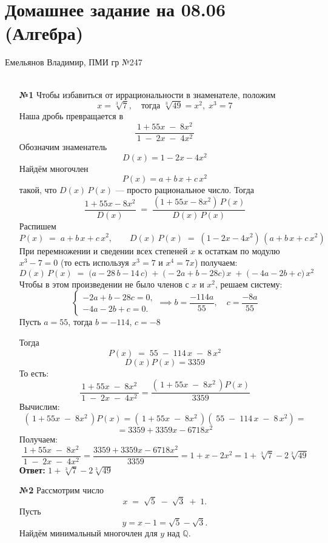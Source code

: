 \documentclass[a4paper]{article}
\renewcommand{\f}[2]{\frac{#1}{#2}}
\begin{document}
\section*{Домашнее задание на 08.06 (Алгебра)}
 {\large Емельянов Владимир, ПМИ гр №247}\\\\
\begin{enumerate}
  \item[\textbf{№1}]Чтобы избавиться от иррациональности в знаменателе, положим
  $$
  x = \sqrt[3]{7},\quad \text{тогда } \sqrt[3]{49} = x^2,\; x^3 = 7
  $$
  Наша дробь превращается в
  $$
  \frac{\,1 + 55x \;-\; 8x^2\,}{\,1 \;-\; 2x \;-\; 4x^2\,}
  $$
  Обозначим знаменатель
  $$
  D(x) = 1 - 2x - 4x^2
  $$
  Найдём многочлен
  $$
  P(x) = a + b\,x + c\,x^2
  $$
  такой, что $D(x)\,P(x)$ — просто рациональное число. Тогда
  $$
  \frac{1 + 55x - 8x^2}{D(x)} \;=\; \frac{(1 + 55x - 8x^2)\,P(x)}{D(x)\,P(x)}
  $$
  Распишем
  $$
  P(x) \;=\; a + b\,x + c\,x^2,
  \qquad 
  D(x)\,P(x) \;=\; (1 - 2x - 4x^2)\,(a + b\,x + c\,x^2)
  $$
  При перемножении и сведении всех степеней $x$ к остаткам по модулю $x^3 - 7 = 0$ (то есть используя $x^3 = 7$ и $x^4 = 7x$) получаем:
  $$
  D(x)\,P(x) \;=\; \bigl(a - 28\,b - 14\,c\bigr)
  \;+\;\bigl(-2a + b - 28c\bigr)\,x 
  \;+\;\bigl(-4a - 2b + c\bigr)\,x^2
  $$
  Чтобы в этом произведении не было членов с $x$ и $x^2$, решаем систему:
  $$
  \begin{cases}
  -2a + b - 28c = 0,\\
  -4a - 2b + c = 0.
  \end{cases} \implies b = \frac{-114a}{55}, \quad c = \frac{-8a}{55} 
  $$
  Пусть $a = 55$, тогда $b = -114$, $c = -8$
      
  Тогда
  $$
  P(x) \;=\; 55 \;-\; 114\,x \;-\; 8\,x^2
  $$
  $$
  D(x)P(x) = 3359
  $$
  То есть:
  $$
  \frac{\,1 + 55x \;-\; 8x^2\,}{\,1 \;-\; 2x \;-\; 4x^2\,} =
  \frac{(\,1 + 55x \;-\; 8x^2\,)P(x)}{3359}
  $$
  Вычислим:
  $$(\,1 + 55x \;-\; 8x^2\,)P(x) = (\,1 + 55x \;-\; 8x^2\,)(\; 55 \;-\; 114\,x \;-\; 8\,x^2) = $$
  $$=3359 + 3359x - 6718x^2$$
  Получаем:
  $$\frac{\,1 + 55x \;-\; 8x^2\,}{\,1 \;-\; 2x \;-\; 4x^2\,} = 
  \f{3359 + 3359x - 6718x^2}{3359} = 1 + x - 2x^2 = 1 + \sqrt[3]{7} -2\sqrt[3]{49}$$
  \textbf{Ответ: } $1 + \sqrt[3]{7} -2\sqrt[3]{49}$\\

  \item[\textbf{№2}]Рассмотрим число
  $$
  x \;=\; \sqrt{5} \;-\; \sqrt{3} \;+\; 1.
  $$
  Пусть 
  $$
  y = x - 1 = \sqrt{5} - \sqrt{3}.
  $$
  Найдём минимальный многочлен для $y$ над $\mathbb{Q}$.


\end{enumerate}
\end{document}
